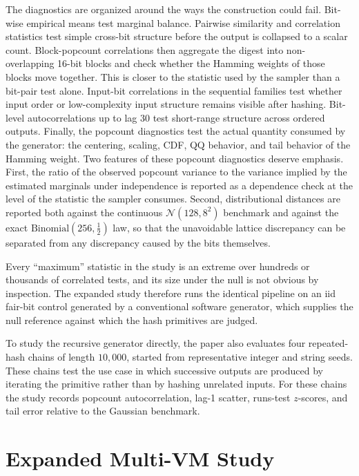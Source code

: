 \documentclass[11pt]{article}
\begin{document}
The diagnostics are organized around the ways the construction could fail.
Bit-wise empirical means test marginal balance. Pairwise similarity and
correlation statistics test simple cross-bit structure before the output is
collapsed to a scalar count. Block-popcount correlations then aggregate the
digest into non-overlapping 16-bit blocks and check whether the Hamming weights
of those blocks move together. This is closer to the statistic used by the
sampler than a bit-pair test alone. Input-bit correlations in the sequential
families test whether input order or low-complexity input structure remains
visible after hashing. Bit-level autocorrelations up to lag $30$ test
short-range structure across ordered outputs. Finally, the popcount diagnostics
test the actual quantity consumed by the generator: the centering, scaling,
CDF, QQ behavior, and tail behavior of the Hamming weight. Two features of
these popcount diagnostics deserve emphasis. First, the ratio of the observed
popcount variance to the variance implied by the estimated marginals under
independence is reported as a dependence check at the level of the statistic
the sampler consumes. Second, distributional distances are reported both
against the continuous $\mathcal{N}(128,8^2)$ benchmark and against the exact
$\mathrm{Binomial}(256,\tfrac12)$ law, so that the unavoidable lattice
discrepancy can be separated from any discrepancy caused by the bits
themselves.

Every ``maximum'' statistic in the study is an extreme over hundreds or
thousands of correlated tests, and its size under the null is not obvious by
inspection. The expanded study therefore runs the identical pipeline on an
iid fair-bit control generated by a conventional software generator, which
supplies the null reference against which the hash primitives are judged.

To study the recursive generator directly, the paper also evaluates four
repeated-hash chains of length $10{,}000$, started from representative integer
and string seeds. These chains test the use case in which successive outputs
are produced by iterating the primitive rather than by hashing unrelated
inputs. For these chains the study records popcount autocorrelation, lag-1
scatter, runs-test $z$-scores, and tail error relative to the Gaussian
benchmark.

\section{Expanded Multi-VM Study}
\end{document}
